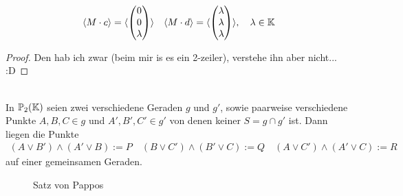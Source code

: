 \begin{thm} 
\begin{align*}
      \langle M \cdot c \rangle = \langle \begin{pmatrix} 0 \\ 0 \\ \lambda \end{pmatrix} \rangle \quad
      \langle M \cdot d \rangle = \langle \begin{pmatrix} \lambda \\ \lambda \\ \lambda  \end{pmatrix} \rangle, \quad \lambda \in \mathbb K
    \end{align*}
  \end{thm}

  \begin{proof}
    Den hab ich zwar (beim mir is es ein 2-zeiler), verstehe ihn aber nicht... :D
  \end{proof}

  \begin{thm} \ \\
    In $\mathbb{P}_2(\mathbb K)$ seien zwei verschiedene Geraden $g$ und $g'$, sowie paarweise verschiedene Punkte $A,B,C \in g$ und $A',B',C' \in g'$ von denen keiner
    $S=g\cap g'$ ist. Dann liegen die Punkte
    \begin{align*}
      (A\vee B') \wedge (A'\vee B) := P \quad (B\vee C') \wedge (B'\vee C) := Q \quad (A\vee C') \wedge (A'\vee C) := R
    \end{align*}
    auf einer gemeinsamen Geraden.

    \begin{figure}[ht]
      
      \caption{Satz von Pappos}
    \end{figure}

  \end{thm}

